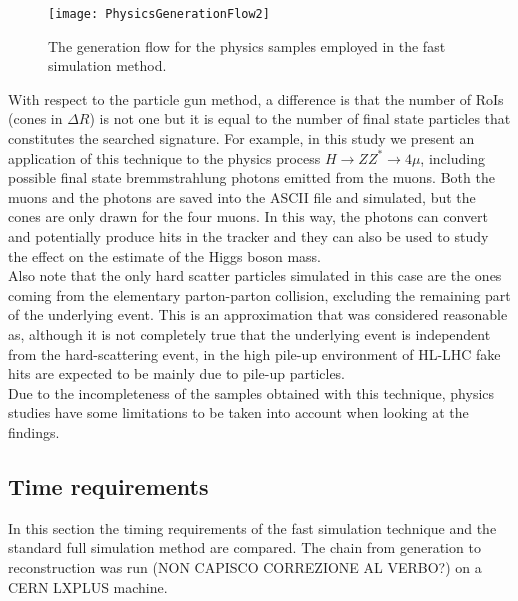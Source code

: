 \documentclass[a4paper,twoside,12pt]{article}
\begin{document}
\begin{figure} [h]
	\texttt{[image: PhysicsGenerationFlow2]}
	\caption{The generation flow for the physics samples employed in the fast 
	simulation method. }
	\label{fig:PhysicsGenerationFlow}
\end{figure}

With respect to the particle gun method, a difference is that the number of RoIs (cones in
$\Delta R$) is not one but it is equal to the number of final state particles that constitutes the
searched signature. For example,
in this study we present an application of this technique to the physics process
$H \rightarrow ZZ^* \rightarrow 4\mu$, including possible final state bremmstrahlung photons emitted from the muons. Both the muons and the photons are saved into the 
ASCII file and simulated, but the cones are only drawn for the four muons. In this way, the photons can convert and potentially produce hits in the
tracker and they can also be used to study the effect on the estimate of the Higgs boson mass.\\

Also note that the only hard scatter particles simulated in this case are the ones coming from
the elementary parton-parton collision, excluding the remaining part of the underlying event. This
is an approximation that was considered reasonable as, although it is not completely
true that the underlying event is independent from the hard-scattering event, in the high pile-up
environment of HL-LHC fake hits are expected to be mainly due to pile-up particles. \\

Due to the incompleteness of the samples obtained with this technique, physics studies have some limitations to be taken into
account when looking at the findings.

\subsection{Time requirements}

In this section the timing requirements of the fast simulation technique and the
standard full simulation method are compared.
The chain from generation to reconstruction was run (NON CAPISCO CORREZIONE AL VERBO?) on a 
CERN LXPLUS machine. \\
\end{document}
